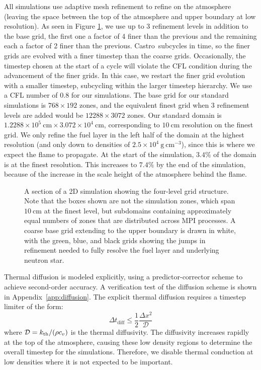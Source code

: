 \documentclass[preprint,times,tighten]{aastex63}
\newcommand{\kth}{k_{\rm th}}
\newcommand{\castro}{{\sf Castro}}
\newcommand{\gcc}{\mathrm{g~cm^{-3} }}
\newcommand{\MarginPar}[1]{
    \marginpar{\vskip-\baselineskip%
               \raggedright%
               \tiny\sffamily%
               {\color{red}\hrule%
               \smallskip%
               #1\par%
               \smallskip%
               \hrule}}%
}
\begin{document}
All simulations use adaptive mesh refinement to refine on the
atmosphere (leaving the space between the top of the atmosphere and
upper boundary at low resolution). As seen in Figure \ref{fig:grids}, 
we use up to 3 refinement levels in addition to the base grid, the first
one a factor of 4 finer than the previous and the remaining each a
factor of 2 finer than the previous. \castro\ subcycles in time, so the 
finer grids are evolved with a finer timestep than the coarse grids. 
Occasionally, the timestep chosen at the start of a cycle will violate
the CFL condition during the advancement of the finer grids. In this
case, we restart the finer grid evolution with a smaller timestep,
subcycling within the larger timestep hierarchy.  We use a CFL number
of 0.8 for our simulations.  
The base grid for our standard
simulations is $768\times 192$ zones, and the equivalent finest grid
when 3 refinement levels are added would be $12288\times 3072$ zones.
Our standard domain is $1.2288\times 10^5~\mathrm{cm} \times
3.072\times 10^4~\mathrm{cm}$, corresponding to $10~\mathrm{cm}$ resolution
on the finest grid.  We only refine the fuel layer in the left half of
the domain at the highest resolution (and only down to densities of
$2.5\times 10^4~\gcc$), since this is where we expect the flame to
propagate.  At the start of the simulation, $3.4\%$ of the domain is
at the finest resolution.  This increases to $7.4\%$ by the end of the
simulation, because of the increase in the scale height of the atmosphere
behind the flame.

\begin{figure}[t]
	\caption{\label{fig:grids}A section of a 2D simulation showing the four-level
		grid structure. Note that the boxes shown are not the simulation zones, which span
		$10~\mathrm{cm}$ at the finest level, but subdomains containing approximately equal
        numbers of zones that are distributed across MPI processes. A coarse base grid
		extending to the upper boundary is drawn in white, with the green, blue, and black
		grids showing the jumps in refinement needed to fully resolve the fuel layer and
		underlying neutron star.}
\end{figure}

Thermal diffusion is modeled explicitly, using a predictor-corrector
scheme to achieve second-order accuracy.  A verification test of the
diffusion scheme is shown in Appendix~\ref{app:diffusion}.  The
explicit thermal diffusion requires a timestep limiter of the form:
\begin{equation}
\Delta t_\mathrm{diff} \le \frac{1}{2} \frac{\Delta x^2}{\mathcal{D}}
\end{equation}
where $\mathcal{D} = \kth/(\rho c_v)$ is the thermal diffusivity.  The
diffusivity increases rapidly at the top of the atmosphere, causing
these low density regions to determine the overall timestep for the
simulations.  Therefore, we disable thermal conduction at low
densities where it is not expected to be important.
\end{document}
